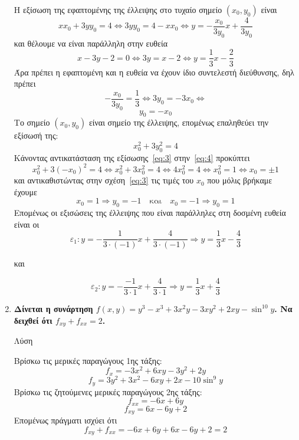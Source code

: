 \begin{enumerate}
    Η εξίσωση της εφαπτομένης της έλλειψης στο τυχαίο σημείο $ (x_{0}, y_{0}) $ είναι
    \[
      x x_{0} + 3y y_{0}= 4 \Leftrightarrow 3y y_{0} = 4 - x x_{0}  \Leftrightarrow y =
      -\frac{x_{0}}{3 y_{0}}x + \frac{4}{3 y_{0}} 
    \]
    και θέλουμε να είναι παράλληλη στην ευθεία 
    \[
      x-3y-2=0 \Leftrightarrow 3y=x-2 \Leftrightarrow y = \frac{1}{3} x - \frac{2}{3}  
    \]
    Άρα πρέπει η εφαπτομένη και η ευθεία να έχουν ίδιο συντελεστή διεύθυνσης, δηλ πρέπει
    \[
      -\frac{x_{0}}{3 y_{0}} = \frac{1}{3} \Leftrightarrow 3 y_{0} = -3 x_{0} \Leftrightarrow 
    \]
    \begin{equation}\label{eq:3}
      y_{0}=- x_{0} 
    \end{equation} 
    Το σημείο $ (x_{0}, y_{0}) $ είναι σημείο της έλλειψης, επομένως επαληθεύει την εξίσωσή της:
    \begin{equation}\label{eq:4}
      x_{0}^{2}+3 y_{0}^{2}=4 
    \end{equation} 
    Κάνοντας αντικατάσταση της εξίσωσης~\eqref{eq:3} στην~\eqref{eq:4} προκύπτει
    \[
      x_{0}^2+3(- x_{0})^{2}=4 \Leftrightarrow x_{0}^{2} + 3 x_{0}^{2} = 4 \Leftrightarrow 4
      x_{0}^{2} = 4 \Leftrightarrow x_{0}^{2} = 1 \Leftrightarrow x_{0} = \pm 1
    \] 
    και αντικαθιστώντας στην σχέση~\eqref{eq:3} τις τιμές του $ x_{0} $ που μόλις βρήκαμε έχουμε
    \[
      x_{0}=1 \Rightarrow y_{0}=-1 \quad \text{και} \quad x_{0}=-1 \Rightarrow y_{0}=1 
    \] 
    Επομένως οι εξισώσεις της έλλειψης που είναι παράλληλες στη δοσμένη ευθεία είναι οι
    \[
      \varepsilon_{1}: y = - \frac{1}{3\cdot (-1)} x + \frac{4}{3\cdot (-1)} \Rightarrow  \boxed {y =
      \frac{1}{3} x - \frac{4}{3}}
    \] 

    και 

    \[
      \varepsilon_{2}: y = - \frac{-1}{3 \cdot 1} x + \frac{4}{3 \cdot 1} \Rightarrow \boxed{y=
      \frac{1}{3} x + \frac{4}{3}}
    \] 

  \item  {\bfseries Δίνεται η συνάρτηση \boldmath $ f(x,y) = y^{3} - x^{3}
      +3x^{2}y - 3xy^{2} + 2xy - \sin^{10}{y} $.
    Να δειχθεί ότι \boldmath $ f_{xy}+f_{xx} = 2 $.}

    \begin{description}
      \item[Λύση]
    \end{description}

    Βρίσκω τις μερικές παραγώγους 1ης τάξης:
    \[ f_{x} = -3x^{2} + 6xy - 3y^{2} + 2y \]
    \[ f_{y} = 3y^{2}+3x^{2}-6xy +2x - 10 \sin^{9}{y}  \]
    Βρίσκω τις ζητούμενες μερικές παραγώγους 2ης τάξης:
    \[
      f_{xx} =  -6x+6y
    \] 
    \[
      f_{xy} = 6x -6y +2
    \] 
    Επομένως πράγματι ισχύει ότι
    \[
      f_{xy}+ f_{xx} = -6x+6y+6x-6y+2 = 2
    \] 



\end{enumerate}
